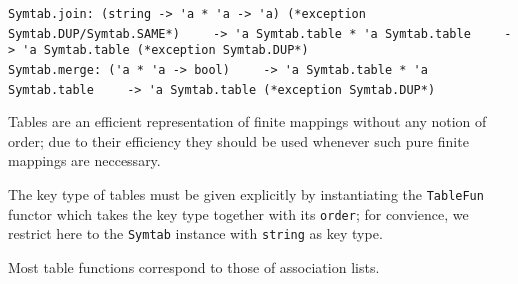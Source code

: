 \begin{isabellebody}
\begin{isamarkuptext}
\begin{mldecls}
  \verb|Symtab.join: (string -> 'a * 'a -> 'a) (*exception Symtab.DUP/Symtab.SAME*)|\isasep\isanewline%
\verb|    -> 'a Symtab.table * 'a Symtab.table|\isasep\isanewline%
\verb|    -> 'a Symtab.table (*exception Symtab.DUP*)| \\
  \verb|Symtab.merge: ('a * 'a -> bool)|\isasep\isanewline%
\verb|    -> 'a Symtab.table * 'a Symtab.table|\isasep\isanewline%
\verb|    -> 'a Symtab.table (*exception Symtab.DUP*)|
  \end{mldecls}%
\end{isamarkuptext}%
\isamarkuptrue%
%
\begin{isamarkuptext}%
Tables are an efficient representation of finite mappings without
  any notion of order;  due to their efficiency they should be used
  whenever such pure finite mappings are neccessary.

  The key type of tables must be given explicitly by instantiating
  the \verb|TableFun| functor which takes the key type
  together with its \verb|order|; for convience, we restrict
  here to the \verb|Symtab| instance with \verb|string|
  as key type.

  Most table functions correspond to those of association lists.%
\end{isamarkuptext}%
\isamarkuptrue%
%
\isadelimtheory
%
\endisadelimtheory
%
\isatagtheory
{}\isamarkupfalse%
%
\endisatagtheory
{\isafoldtheory}%
%
\isadelimtheory
%
\endisadelimtheory
\isanewline
\end{isabellebody}%
